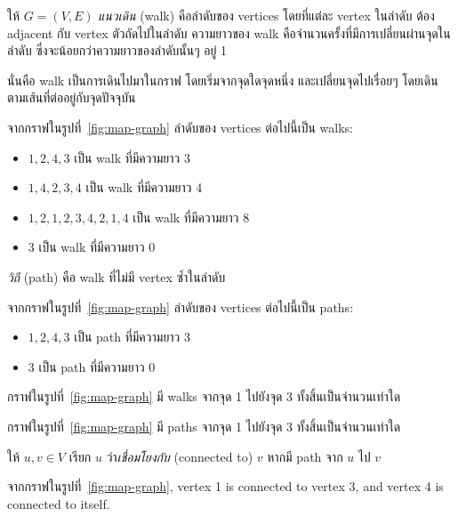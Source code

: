 \begin{definition}
ให้ $G=(V,E)$ \enskip \emph{แนวเดิน} (walk) คือลำดับของ vertices โดยที่แต่ละ vertex ในลำดับ ต้อง adjacent กับ vertex ตัวถัดไปในลำดับ \enskip ความยาวของ walk คือจำนวนครั้งที่มีการเปลี่ยนผ่านจุดในลำดับ ซึ่งจะน้อยกว่าความยาวของลำดับนั้นๆ อยู่ 1
\end{definition}
นั่นคือ walk เป็นการเดินไปมาในกราฟ โดยเริ่มจากจุดใดจุดหนึ่ง และเปลี่ยนจุดไปเรื่อยๆ โดยเดินตามเส้นที่ต่ออยู่กับจุดปัจจุบัน

\begin{example}
จากกราฟในรูปที่~\ref{fig:map-graph} ลำดับของ vertices ต่อไปนี้เป็น walks:
\begin{itemize}
\item $1,2,4,3$ เป็น walk ที่มีความยาว 3
\item $1,4,2,3,4$ เป็น walk ที่มีความยาว 4
\item $1,2,1,2,3,4,2,1,4$ เป็น walk ที่มีความยาว 8
\item $3$ เป็น walk ที่มีความยาว 0
\end{itemize}
\end{example}

\begin{definition}
\emph{วิถี} (path) คือ walk ที่ไม่มี vertex ซ้ำในลำดับ
\end{definition}
%
\begin{example}
จากกราฟในรูปที่~\ref{fig:map-graph} ลำดับของ vertices ต่อไปนี้เป็น paths:
\begin{itemize}
\item $1,2,4,3$ เป็น path ที่มีความยาว 3
\item $3$ เป็น path ที่มีความยาว 0
\end{itemize}
\end{example}

\begin{exercise}
กราฟในรูปที่~\ref{fig:map-graph} มี walks จากจุด 1 ไปยังจุด 3 ทั้งสิ้นเป็นจำนวนเท่าใด
\end{exercise}

\begin{exercise}
กราฟในรูปที่~\ref{fig:map-graph} มี paths จากจุด 1 ไปยังจุด 3 ทั้งสิ้นเป็นจำนวนเท่าใด
\end{exercise}

\begin{definition}
ให้ $u,v\in V$ \enskip เรียก $u$ ว่า\emph{เชื่อมโยงกับ} (connected to) $v$ หากมี path จาก $u$ ไป $v$
\end{definition}
%
\begin{example}
จากกราฟในรูปที่~\ref{fig:map-graph}, vertex 1 is connected to vertex 3, and vertex 4 is connected to itself.
\end{example}

